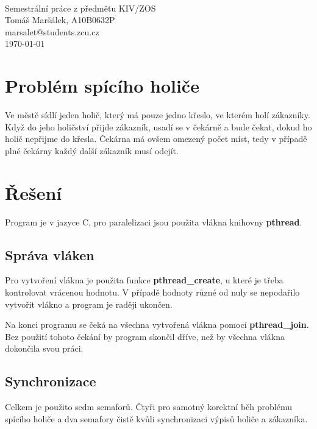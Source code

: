\documentclass[titlepage]{article}
\begin{document}
\begin{titlepage}
\begin{center}
	\mbox{} \\[3cm]
	\huge{Semestrální práce z předmětu KIV/ZOS} \\[2.5cm]
	\Large{Tomáš Maršálek, A10B0632P} \\
	\large{marsalet@students.zcu.cz} \\[1cm]
	\normalsize{\today}
\end{center}
\thispagestyle{empty}
\end{titlepage}

\section{Problém spícího holiče}
Ve městě sídlí jeden holič, který má pouze jedno křeslo, ve kterém holí
zákazníky. Když do jeho holičství přijde zákazník, usadí se v čekárně a bude
čekat, dokud ho holič nepřijme do křesla. Čekárna má ovšem omezený počet míst,
tedy v případě plné čekárny každý další zákazník musí odejít.

\section{Řešení}
Program je v jazyce C, pro paralelizaci jsou použita vlákna knihovny
\textbf{pthread}.

\subsection{Správa vláken}
Pro vytvoření vlákna je použita funkce \textbf{pthread\_create}, u které je
třeba kontrolovat vrácenou hodnotu. V případě hodnoty různé od nuly se
nepodařilo vytvořit vlákno a program je raději ukončen.  

Na konci programu se čeká na všechna vytvořená vlákna pomocí
\textbf{pthread\_join}. Bez použití tohoto čekání by program skončil dříve, než
by všechna vlákna dokončila svou práci.

\subsection{Synchronizace}
Celkem je použito sedm semaforů. Čtyři pro samotný korektní běh problému
spícího holiče a dva semafory čistě kvůli synchronizaci výpisů holiče a
zákazníka. 
\end{document}

